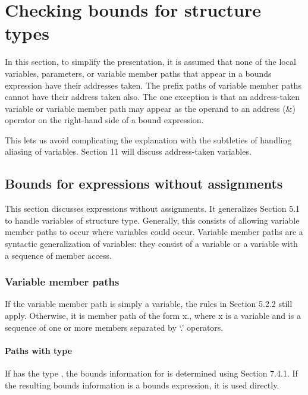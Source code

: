 
\chapter{Checking bounds for structure types}\label{checking-bounds-for-structure-types}

In this section, to simplify the presentation, it is assumed that none
of the local variables, parameters, or variable member paths that appear
in a bounds expression have their addresses taken. The prefix paths of
variable member paths cannot have their address taken also. The one
exception is that an address-taken variable or variable member path may
appear as the operand to an address (\&) operator on the right-hand side
of a bound expression.

This lets us avoid complicating the explanation with the subtleties of
handling aliasing of variables. Section 11 will discuss address-taken
variables.

\section{Bounds for expressions without assignments}\label{bounds-for-expressions-without-assignments}

This section discusses expressions without assignments. It generalizes
Section 5.1 to handle variables of structure type. Generally, this
consists of allowing variable member paths to occur where variables
could occur. Variable member paths are a syntactic generalization of
variables: they consist of a variable or a variable with a sequence of
member access.

\subsection{Variable member paths}\label{variable-member-paths}

If the variable member path is simply a variable, the rules in Section
5.2.2 still apply. Otherwise, it is member path of the form
x., where x is a variable and  is a sequence of
one or more members separated by `.' operators.

\subsubsection{Paths with type \arrayptr}\label{paths-with-type-arrayux5fptr}

If  has the type \arrayptr, the bounds information for
 is determined using Section 7.4.1. If the resulting bounds
information is a bounds expression, it is used directly.

